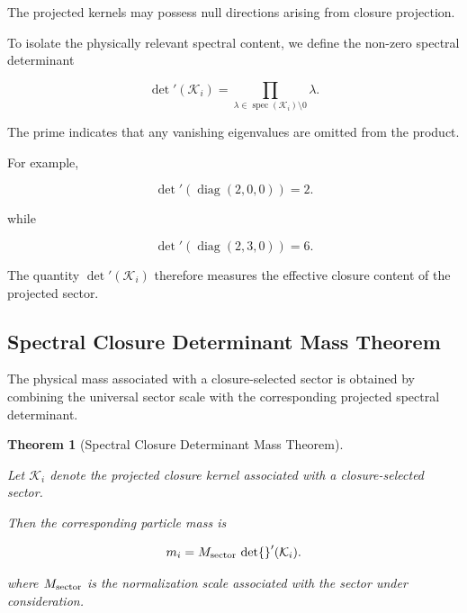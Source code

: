 \documentclass[11pt]{article}
\newtheorem{theorem}{Theorem}[section]
\theoremstyle{definition}
\theoremstyle{remark}
\begin{document}
The projected kernels may possess null directions arising from
closure projection.

To isolate the physically relevant spectral content, we define
the non-zero spectral determinant

\begin{equation}
\det{}'(\mathcal K_i) = 
\prod_{\lambda \in
\operatorname{spec}(\mathcal K_i)
\setminus {0}}
\lambda.
\label{eq:reduced_determinant}
\end{equation}

The prime indicates that any vanishing eigenvalues are omitted
from the product.

For example,

\begin{equation}
\det{}'\!\left(
\operatorname{diag}(2,0,0)
\right)
=
2.
\end{equation}

while

\begin{equation}
\det{}'\!\left(
\operatorname{diag}(2,3,0)
\right)
=
6.
\end{equation}

The quantity \(\det{}'(\mathcal K_i)\) therefore measures the
effective closure content of the projected sector.


\subsection{Spectral Closure Determinant Mass Theorem}
\label{subsec:mass_theorem}

The physical mass associated with a closure-selected sector is
obtained by combining the universal sector scale with the
corresponding projected spectral determinant.

\begin{theorem}[Spectral Closure Determinant Mass Theorem]
\label{thm:spectral_mass_theorem}

Let \(\mathcal K_i\) denote the projected closure kernel
associated with a closure-selected sector.

Then the corresponding particle mass is

\begin{equation}
m_i
=
M_{\rm sector}\,
\det{}'(\mathcal K_i).
\label{eq:spectral_mass_theorem}
\end{equation}

where \(M_{\rm sector}\) is the normalization scale associated
with the sector under consideration.

\end{theorem}
\end{document}
